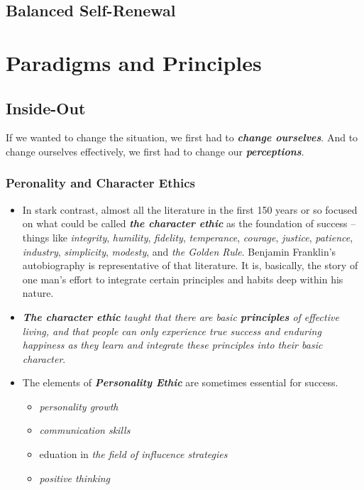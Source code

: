 \documentclass[11pt]{article}
\begin{document}
\subsection{Balanced Self-Renewal}

\newpage
\section{Paradigms and Principles}
\subsection{Inside-Out}
If we wanted to change the situation, we first had to \emph{\textbf{change ourselves}}. And to change ourselves effectively, we first had to change our \emph{\textbf{perceptions}}.
\subsubsection{Peronality and Character Ethics}
\begin{itemize}
\item In stark contrast, almost all the literature in the first 150 years or so focused on what could be called \emph{\textbf{the character ethic}} as the foundation of success -- things like \emph{integrity}, \emph{humility}, \emph{fidelity}, \emph{temperance}, \emph{courage}, \emph{justice}, \emph{patience}, \emph{industry}, \emph{simplicity}, \emph{modesty}, and \emph{the Golden Rule}. Benjamin Franklin's autobiography is representative of that literature. It is, basically, the story of one man's effort to integrate certain principles and habits deep within his nature.

\item \emph{\textbf{The character ethic} taught that there are basic \textbf{principles} of effective living, and that people can only experience true success and enduring happiness as they learn and integrate these principles into their basic character}.

\item The elements of \emph{\textbf{Personality Ethic}} are sometimes essential for success.
\begin{itemize}
\item \emph{personality growth}
\item \emph{communication skills}
\item eduation in \emph{the field of influcence strategies}
\item \emph{positive thinking}
\end{itemize} 
\end{itemize}
\end{document}
